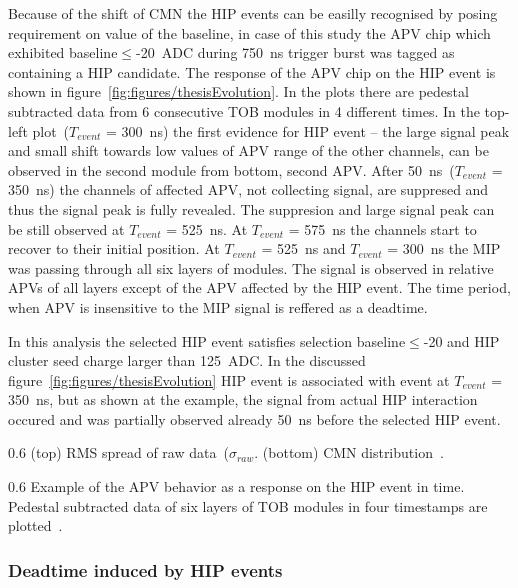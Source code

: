 Because of the shift of CMN the HIP events can be easilly recognised by posing requirement on value of the baseline, in case of this study the APV chip which exhibited baseline$\leq$-20~ADC during 750~ns trigger burst was tagged as containing a  HIP candidate. The response of the APV chip on the HIP event is shown in figure~\ref{fig:figures/thesisEvolution}. In the plots there are pedestal subtracted data from 6 consecutive TOB modules in 4 different times. In the top-left plot~($T_{event}$ = 300~ns) the first evidence for HIP event -- the large signal peak and small shift towards low values of APV range of the other channels, can be observed in the second module from bottom, second APV. After 50~ns~($T_{event}$ = 350~ns) the channels of affected APV, not collecting signal, are suppresed and thus the signal peak is fully revealed. The suppresion and large signal peak can be still observed at $T_{event}$ = 525~ns. At $T_{event}$ = 575~ns the channels start to recover to their initial position. At $T_{event}$ = 525~ns and $T_{event}$ = 300~ns the MIP was passing through all six layers of modules. The signal is observed in relative APVs of all layers except of the APV affected by the HIP event. The time period, when APV is insensitive to the MIP signal is reffered as a deadtime.

In this analysis the selected HIP event satisfies selection baseline$\leq$-20 and HIP cluster seed charge larger than 125~ADC.  In the discussed figure~\ref{fig:figures/thesisEvolution} HIP event is associated with event at $T_{event}$ = 350~ns, but as shown at the example, the signal from actual HIP interaction occured and was partially observed already 50~ns before the selected HIP event.

                 {0.6}       %
                 {(top) RMS spread of raw data~($\sigma_{raw}$. (bottom) CMN distribution~\cite{Bainbridge:2004jc}.} %


                 {0.6}       %
                 {Example of the APV behavior as a response on the HIP event in time. Pedestal subtracted data of six layers of TOB modules in four timestamps are plotted~\cite{Bainbridge:2004jc}.} %



\subsubsection{Deadtime induced by HIP events}

